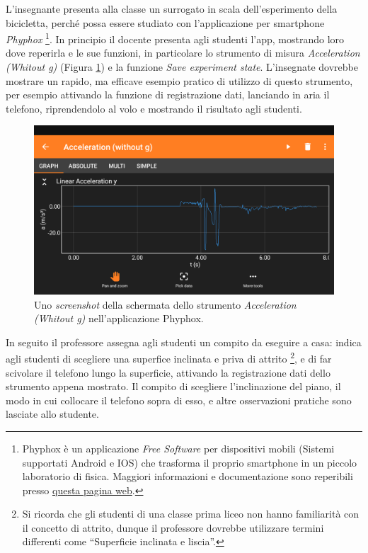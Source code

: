 \documentclass{report} \usepackage[T1]{fontenc} \usepackage[italian]{babel}
\begin{document}
L'insegnante presenta alla classe un surrogato in scala dell'esperimento della
bicicletta, perché possa essere studiato con l'applicazione per smartphone
\emph{Phyphox}
\footnote{
          Phyphox è un applicazione \emph{Free Software} per dispositivi mobili
          (Sistemi supportati Android e IOS) che trasforma il proprio
          smartphone in un piccolo laboratorio di fisica. Maggiori
          informazioni e documentazione sono reperibili presso
          \href{https://phyphox.org/}{questa pagina web}.
         }.
In principio il docente presenta agli studenti l'app, mostrando loro dove
reperirla e le sue funzioni, in particolare lo strumento di misura
\emph{Acceleration (Whitout g)} (Figura \ref{fig:phyphox}) e la funzione
\emph{Save experiment state}.
L'insegnate dovrebbe mostrare un rapido, ma efficave esempio pratico
di utilizzo di questo strumento, per esempio attivando la funzione
di registrazione dati, lanciando in aria il telefono, riprendendolo
al volo e mostrando il risultato agli studenti.
\begin{figure}[H]
\centering
  \includegraphics[width=\textwidth]{phyphox}
  \caption{Uno \emph{screenshot} della schermata dello strumento
           \emph{Acceleration (Whitout g)}
           nell'applicazione Phyphox.}
  \label{fig:phyphox}
\end{figure}
In seguito il professore assegna agli studenti un compito da eseguire
a casa: indica agli studenti di scegliere una superfice inclinata
e priva di attrito
\footnote{
          Si ricorda che gli studenti di una classe prima liceo
          non hanno familiarità con il concetto di attrito,
          dunque il professore dovrebbe utilizzare termini differenti
          come ``Superficie inclinata e liscia''.
         },
e di far scivolare il telefono lungo la superficie, attivando
la registrazione dati dello strumento appena mostrato.
Il compito di scegliere l'inclinazione del piano, il modo in cui
collocare il telefono sopra di esso, e altre osservazioni pratiche
sono lasciate allo studente.
\end{document}

